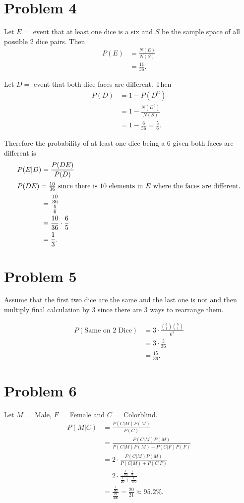 \documentclass[12pt]{extarticle}
\begin{document}
\section*{Problem 4}
Let $E = $ event that at least one dice is a six and $S$ be the sample space of all possible $2$ dice pairs. Then
\begin{align*}
	P(E) &= \frac{N(E)}{N(S)} \\
			 &= \frac{11}{36}
.\end{align*}

Let $D = $ event that both dice faces are different. Then
\begin{align*}
	P(D) &= 1 - P(D^\complement) \\
			 &= 1 - \frac{N(D^\complement)}{N(S)} \\
			 &= 1 - \frac{6}{36}
			 = \frac{5}{6}
.\end{align*}

Therefore the probability of at least one dice being a $6$ given both faces are different is
\begin{align*}
	P(E|D) &= \frac{P(DE)}{P(D)} \\
	\intertext{$P(DE) = \frac{10}{36}$ since there is $10$ elements in $E$ where the faces are different.}
				 &= \frac{\frac{10}{36}}{\frac{5}{6}} \\
				 &= \frac{10}{36} \cdot \frac{6}{5} \\
				 &= \frac{1}{3}
.\end{align*}

\section*{Problem 5}
Assume that the first two dice are the same and the last one is not and then multiply final calculation by $3$ since there are $3$ ways to rearrange them.

\begin{align*}
	P(\text{Same on 2 Dice}) &= 3 \cdot \frac{\binom{6}{1} \binom{5}{1}}{6^3} \\
													 &= 3 \cdot \frac{5}{36} \\
													 &= \frac{15}{36}
.\end{align*}

\section*{Problem 6}
Let $M=$ Male, $F=$ Female and $C=$ Colorblind.
\begin{align*}
	P(M | C) &= \frac{P(C | M) P(M)}{P(C)} \\
					 &= \frac{P(C | M) P(M)}{P(C|M)P(M) + P(C|F)P(F)} \\
					 &= 2 \cdot \frac{P(C | M) P(M)}{P(C|M) + P(C|F)} \\
					 &= 2 \cdot \frac{\frac{1}{20}\cdot\frac{1}{2}}{\frac{1}{20} + \frac{1}{400}} \\
					 &= \frac{\frac{1}{20}}{\frac{21}{400}}
					 = \frac{20}{21} \approx 95.2\%
.\end{align*}
\end{document}
